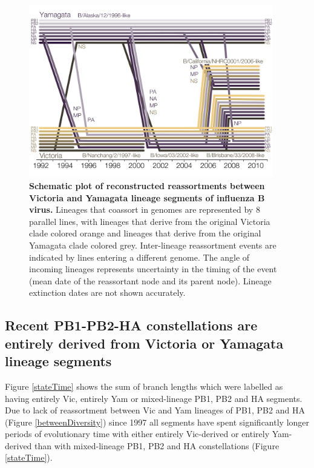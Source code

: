 \documentclass[11pt,oneside,letterpaper]{article}
\begin{document}
\begin{figure}[h]
	\centering		
	\includegraphics[width=0.95\textwidth]{figures/RailroadPlotDated.pdf}
	\caption{\textbf{Schematic plot of reconstructed reassortments between Victoria and Yamagata lineage segments of influenza B virus.}
Lineages that coassort in genomes are represented by 8 parallel lines, with lineages that derive from the original Victoria clade colored orange and lineages that derive from the original Yamagata clade colored grey.
Inter-lineage reassortment events are indicated by lines entering a different genome.
The angle of incoming lineages represents uncertainty in the timing of the event (mean date of the reassortant node and its parent node).
Lineage extinction dates are not shown accurately.}
	\label{railroadPlot}
\end{figure}

\subsection*{Recent PB1-PB2-HA constellations are entirely derived from Victoria or Yamagata lineage segments}
Figure \ref{stateTime} shows the sum of branch lengths which were labelled as having entirely Vic, entirely Yam or mixed-lineage PB1, PB2 and HA segments.
Due to lack of reassortment between Vic and Yam lineages of PB1, PB2 and HA (Figure \ref{betweenDiversity}) since 1997 all segments have spent significantly longer periods of evolutionary time with either entirely Vic-derived or entirely Yam-derived than with mixed-lineage PB1, PB2 and HA constellations (Figure \ref{stateTime}).
\end{document}
